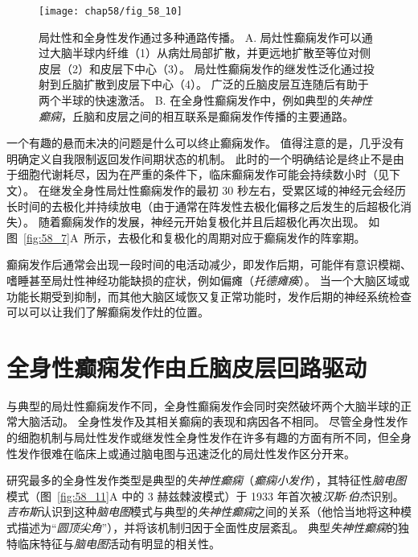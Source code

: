 \begin{figure}[htbp]
	\centering
	\texttt{[image: chap58/fig\_58\_10]}
	\caption{局灶性和全身性发作通过多种通路传播\cite{lothman1993pathophysiology}。
		A. 局灶性癫痫发作可以通过大脑半球内纤维（1）从病灶局部扩散，并更远地扩散至等位对侧皮层（2）和皮层下中心（3）。
		局灶性癫痫发作的继发性泛化通过投射到丘脑扩散到皮层下中心（4）。
		广泛的丘脑皮层互连随后有助于两个半球的快速激活。
		B. 在全身性癫痫发作中，例如典型的\textit{失神性癫痫}，丘脑和皮层之间的相互联系是癫痫发作传播的主要通路。}
	\label{fig:58_10}
\end{figure}


一个有趣的悬而未决的问题是什么可以终止癫痫发作。
值得注意的是，几乎没有明确定义自我限制返回发作间期状态的机制。
此时的一个明确结论是终止不是由于细胞代谢耗尽，因为在严重的条件下，临床癫痫发作可能会持续数小时（见下文）。
在继发全身性局灶性癫痫发作的最初 30 秒左右，受累区域的神经元会经历长时间的去极化并持续放电（由于通常在阵发性去极化偏移之后发生的后超极化消失）。
随着癫痫发作的发展，神经元开始复极化并且后超极化再次出现。
如图~\ref{fig:58_7}A~所示，去极化和复极化的周期对应于癫痫发作的阵挛期。


癫痫发作后通常会出现一段时间的电活动减少，即发作后期，可能伴有意识模糊、嗜睡甚至局灶性神经功能缺损的症状，例如偏瘫（\textit{托德瘫痪}）。
当一个大脑区域或功能长期受到抑制，而其他大脑区域恢又复正常功能时，发作后期的神经系统检查可以可以让我们了解癫痫发作灶的位置。



\section{全身性癫痫发作由丘脑皮层回路驱动}

与典型的局灶性癫痫发作不同，全身性癫痫发作会同时突然破坏两个大脑半球的正常大脑活动。
全身性发作及其相关癫痫的表现和病因各不相同。
尽管全身性发作的细胞机制与局灶性发作或继发性全身性发作在许多有趣的方面有所不同，但全身性发作很难在临床上或通过脑电图与迅速泛化的局灶性发作区分开来。


研究最多的全身性发作类型是典型的\textit{失神性癫痫}（\textit{癫痫小发作}），其特征性\textit{脑电图}模式（图~\ref{fig:58_11}A 中的 3 赫兹棘波模式）于 1933 年首次被\textit{汉斯$\cdot$伯杰}识别。
\textit{吉布斯}认识到这种\textit{脑电图}模式与典型的\textit{失神性癫痫}之间的关系（他恰当地将这种模式描述为“\textit{圆顶尖角}”），并将该机制归因于全面性皮层紊乱。
典型\textit{失神性癫痫}的独特临床特征与\textit{脑电图}活动有明显的相关性。


